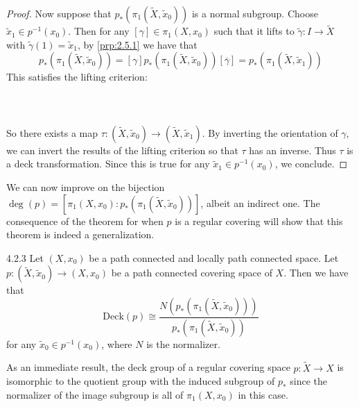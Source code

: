 \documentclass[a4paper]{article}
\begin{document}
\begin{prp}{}{}
\begin{proof}
Now suppose that $p_\ast(\pi_1(\tilde{X},\tilde{x}_0))$ is a normal subgroup. Choose $\tilde{x}_1\in p^{-1}(x_0)$. Then for any $[\gamma]\in\pi_1(X,x_0)$ such that it lifts to $\tilde{\gamma}:I\to\tilde{X}$ with $\tilde{\gamma}(1)=\tilde{x}_1$, by \ref{prp:2.5.1} we have that $$p_\ast(\pi_1(\tilde{X},\tilde{x}_0))=[\gamma]p_\ast(\pi_1(\tilde{X},\tilde{x}_0))[\overline{\gamma}]=p_\ast(\pi_1(\tilde{X},\tilde{x}_1))$$ This satisfies the lifting criterion: \\~\\
\\~\\
So there exists a map $\tau:(\tilde{X},\tilde{x}_0)\to(\tilde{X},\tilde{x}_1)$. By inverting the orientation of $\gamma$, we can invert the results of the lifting criterion so that $\tau$ has an inverse. Thus $\tau$ is a deck transformation. Since this is true for any $\tilde{x}_1\in p^{-1}(x_0)$, we conclude. 
\end{proof}
\end{prp}

We can now improve on the bijection $\deg(p)=[\pi_1(X,x_0):p_\ast(\pi_1(\tilde{X},\tilde{x}_0))]$, albeit an indirect one. The consequence of the theorem for when $p$ is a regular covering will show that this theorem is indeed a generalization. 

\begin{thm}{}{4.2.3} Let $(X,x_0)$ be a path connected and locally path connected space. Let $p:(\tilde{X},\tilde{x}_0)\to(X,x_0)$ be a path connected covering space of $X$. Then we have that $$\text{Deck}(p)\cong\frac{N(p_\ast(\pi_1(\tilde{X},\tilde{x}_0)))}{p_\ast(\pi_1(\tilde{X},\tilde{x}_0))}$$ for any $\tilde{x}_0\in p^{-1}(x_0)$, where $N$ is the normalizer. 
\end{thm}

As an immediate result, the deck group of a regular covering space $p:\tilde{X}\to X$ is isomorphic to the quotient group with the induced subgroup of $p_\ast$ since the normalizer of the image subgroup is all of $\pi_1(X,x_0)$ in this case. 
\end{document}
